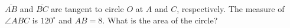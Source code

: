 $\overline{AB}$ and $\overline{BC}$ are tangent to circle $O$ at $A$ and $C$, respectively. The measure of $\angle ABC$ is $120^\circ$ and $AB=8$. What is the area of the circle?
